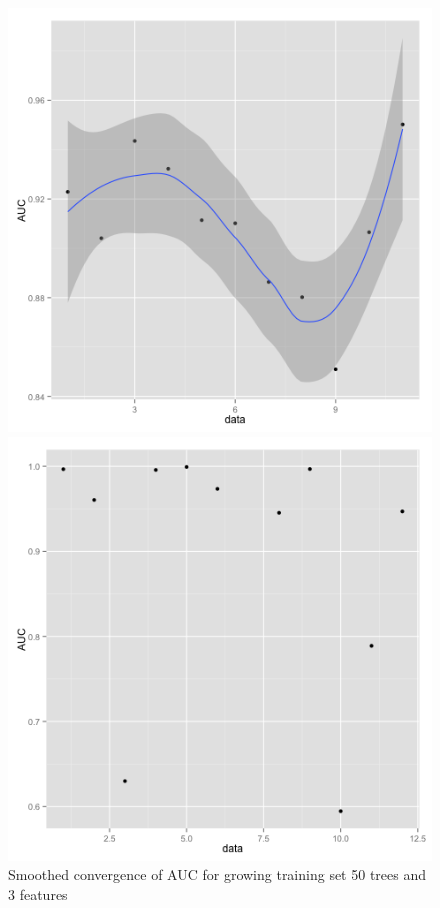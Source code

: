 \documentclass{article}\usepackage[]{graphicx}\usepackage[]{color}
\begin{document}
\begin{figure}[h]
  \includegraphics[width=\linewidth]{AUCconverge.png}
  \caption{Smoothed convergence of AUC for growing training set 50 trees and 3 features}\label{}
\endminipage\hfill
{}
  \includegraphics[width=\linewidth]{CVAUC.png}

\end{figure}
\end{document}
